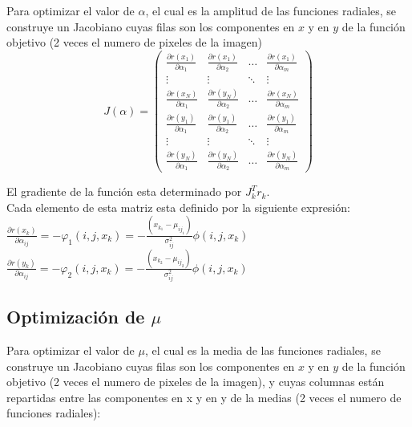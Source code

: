 \documentclass[10pt,journal,compsoc]{styles/IEEEtran}
\begin{document}
Para optimizar el valor de $\alpha$, el cual es la amplitud de las funciones radiales, se construye un Jacobiano cuyas filas son los componentes en $x$ y en $y$ de la función objetivo (2 veces el numero de pixeles de la imagen)\\

\[J(\alpha)= \left( \begin{array}{cccc}
\frac{\partial r(x_1)}{\partial \alpha_1} & \frac{\partial r(x_1)}{\partial \alpha_2} & \ldots & \frac{\partial r(x_1)}{\partial \alpha_m} \\
\vdots & \vdots & \ddots & \vdots \\
\frac{\partial r(x_N)}{\partial \alpha_1} & \frac{\partial r(y_N)}{\partial \alpha_2} & \ldots & \frac{\partial r(x_N)}{\partial \alpha_m} \\
\frac{\partial r(y_1)}{\partial \alpha_1} & \frac{\partial r(y_1)}{\partial \alpha_2} & \ldots & \frac{\partial r(y_1)}{\partial \alpha_m} \\
\vdots & \vdots & \ddots & \vdots \\
\frac{\partial r(y_N)}{\partial \alpha_1} & \frac{\partial r(y_N)}{\partial \alpha_2} & \ldots & \frac{\partial r(y_N)}{\partial \alpha_m} 
\end{array} \right)\] 

El gradiente de la función esta determinado por $J_k^Tr_k$.\\

Cada elemento de esta matriz esta definido por la siguiente expresión:\\

$\frac{\partial r(x_k)}{\partial \alpha_{ij}}=-\varphi_1(i,j,x_k)=-\frac{(x_{k_1}-\mu_{ij_1})}{\sigma_{ij}^2}\phi(i,j,x_k)$\\

$\frac{\partial r(y_k)}{\partial \alpha_{ij}}=-\varphi_2(i,j,x_k)=-\frac{(x_{k_2}-\mu_{ij_2})}{\sigma_{ij}^2}\phi(i,j,x_k)$\\

\subsection{Optimización de $\mu$}

Para optimizar el valor de $\mu$, el cual es la media de las funciones radiales, se construye un Jacobiano cuyas filas son los componentes en $x$ y en $y$ de la función objetivo (2 veces el numero de pixeles de la imagen), y cuyas columnas están repartidas entre las componentes en x y en y de la medias (2 veces el numero de funciones radiales):\\
\end{document}

